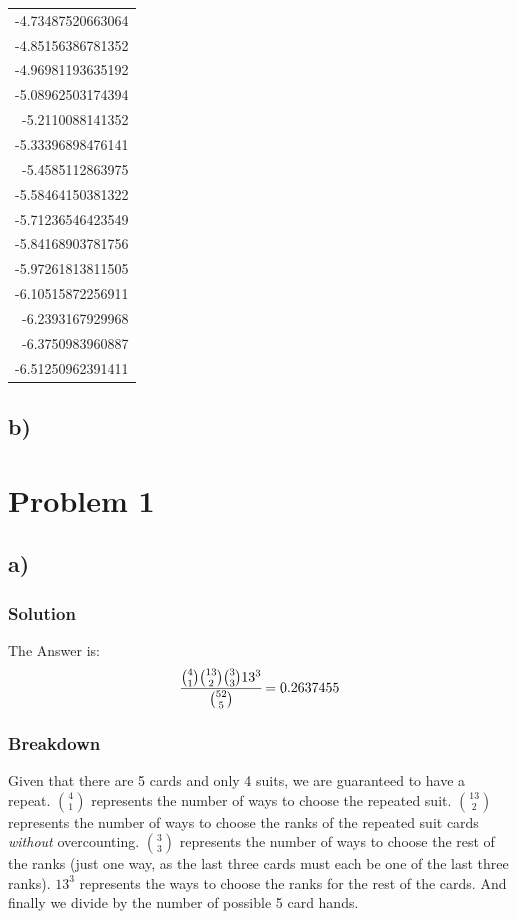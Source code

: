 \documentclass[11pt]{article}
\begin{document}
\begin{center}
\begin{tabular}{r}
-4.73487520663064\\
-4.85156386781352\\
-4.96981193635192\\
-5.08962503174394\\
-5.2110088141352\\
-5.33396898476141\\
-5.4585112863975\\
-5.58464150381322\\
-5.71236546423549\\
-5.84168903781756\\
-5.97261813811505\\
-6.10515872256911\\
-6.2393167929968\\
-6.3750983960887\\
-6.51250962391411\\
\end{tabular}
\end{center}

\subsection*{b)}
\label{sec:org2c3c953}

\section*{Problem 1}
\label{sec:orga78a944}
\subsection*{a)}
\label{sec:org894ba6b}

\subsubsection*{Solution}
\label{sec:orgda37004}

The Answer is: 
\begin{equation}
\cfrac{{{4}\choose{1}} {{13}\choose{2}} {{3}\choose{3}} 13^3}{{{52}\choose{5}}} = 0.2637455
\end{equation}

\subsubsection*{Breakdown}
\label{sec:org789e395}

Given that there are 5 cards and only 4 suits, we are guaranteed to have a repeat. \({{4}\choose{1}}\) represents the number of ways to choose the repeated suit. \({{13}\choose{2}}\) represents the number of ways to choose the ranks of the repeated suit cards \emph{without} overcounting. \({{3}\choose{3}}\) represents the number of ways to choose the rest of the ranks (just one way, as the last three cards must each be one of the last three ranks). \(13^{3}\) represents the ways to choose the ranks for the rest of the cards. And finally we divide by the number of possible 5 card hands. 
\end{document}
